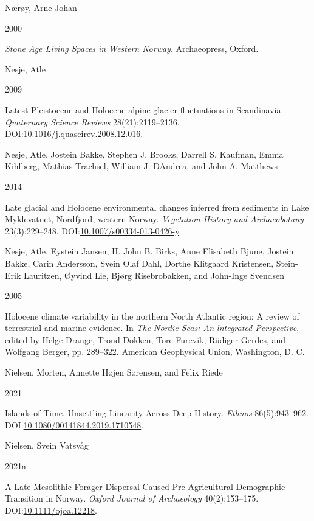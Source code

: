 \documentclass[
  12pt,
  a4paper,
  oneside]{book}
\newlength{\cslhangindent}
\newlength{\csllabelwidth}
\newlength{\cslentryspacingunit} %
\newenvironment{CSLReferences}[2] %
 {%
  \setlength{\parindent}{0pt}
  \ifodd #1
  \let\oldpar\par
  \def\par{\hangindent=\cslhangindent\oldpar}
  \fi
  \setlength{\parskip}{#2\cslentryspacingunit}
 }%
 {}
\newcommand{\CSLBlock}[1]{#1\hfill\break}
\newcommand{\CSLLeftMargin}[1]{\parbox[t]{\csllabelwidth}{#1}}
\newcommand{\CSLRightInline}[1]{\parbox[t]{\linewidth - \csllabelwidth}{#1}\break}
\begin{document}
\begin{CSLReferences}{0}{0}
\leavevmode{}%
\CSLBlock{Nærøy, Arne Johan}
\CSLLeftMargin{ 2000}
\CSLRightInline{\emph{{Stone Age Living Spaces in Western Norway}}. Archaeopress, Oxford.}

\leavevmode{}%
\CSLBlock{Nesje, Atle}
\CSLLeftMargin{ 2009}
\CSLRightInline{Latest Pleistocene and Holocene alpine glacier fluctuations in Scandinavia. \emph{Quaternary Science Reviews} 28(21):2119--2136. DOI:\href{https://doi.org/10.1016/j.quascirev.2008.12.016}{10.1016/j.quascirev.2008.12.016}.}

\leavevmode{}%
\CSLBlock{Nesje, Atle, Jostein Bakke, Stephen J. Brooks, Darrell S. Kaufman, Emma Kihlberg, Mathias Trachsel, William J. DAndrea, and John A. Matthews}
\CSLLeftMargin{ 2014}
\CSLRightInline{Late glacial and Holocene environmental changes inferred from sediments in Lake Myklevatnet, Nordfjord, western Norway. \emph{Vegetation History and Archaeobotany} 23(3):229--248. DOI:\href{https://doi.org/10.1007/s00334-013-0426-y}{10.1007/s00334-013-0426-y}.}

\leavevmode{}%
\CSLBlock{Nesje, Atle, Eystein Jansen, H. John B. Birks, Anne Elisabeth Bjune, Jostein Bakke, Carin Andersson, Svein Olaf Dahl, Dorthe Klitgaard Kristensen, Stein-Erik Lauritzen, Øyvind Lie, Bjørg Risebrobakken, and John-Inge Svendsen}
\CSLLeftMargin{ 2005}
\CSLRightInline{{Holocene climate variability in the northern North Atlantic region: A review of terrestrial and marine evidence}. In \emph{{The Nordic Seas: An lntegrated Perspective}}, edited by Helge Drange, Trond Dokken, Tore Furevik, Rüdiger Gerdes, and Wolfgang Berger, pp. 289--322. American Geophysical Union, Washington, D. C.}

\leavevmode{}%
\CSLBlock{Nielsen, Morten, Annette Højen Sørensen, and Felix Riede}
\CSLLeftMargin{ 2021}
\CSLRightInline{{Islands of Time. Unsettling Linearity Across Deep History}. \emph{Ethnos} 86(5):943--962. DOI:\href{https://doi.org/10.1080/00141844.2019.1710548}{10.1080/00141844.2019.1710548}.}

\leavevmode{}%
\CSLBlock{Nielsen, Svein Vatsvåg}
\CSLLeftMargin{ 2021a}
\CSLRightInline{A Late Mesolithic Forager Dispersal Caused Pre-Agricultural Demographic Transition in Norway. \emph{Oxford Journal of Archaeology} 40(2):153--175. DOI:\href{https://doi.org/10.1111/ojoa.12218}{10.1111/ojoa.12218}.}


\end{CSLReferences}
\end{document}
